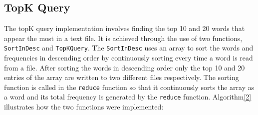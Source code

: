 \documentclass[conference]{IEEEtran}
\begin{document}
\subsection{TopK Query}
The topK query implementation involves finding the top 10 and 20 words that appear the most in a text file. It is achieved through the use of two functions, \texttt{SortInDesc} and \texttt{TopKQuery}. The \texttt{SortInDesc} uses an array to sort the words and frequencies in descending order by continuously sorting every time a word is read from a file. After sorting the words in descending order only the top 10 and 20 entries of the array are written to two different files respectively. The sorting function is called in the \texttt{reduce} function so that it continuously sorts the array as a word and its total frequency is generated by the \texttt{reduce} function. Algorithm\ref{2} illustrates how the two functions were implemented:
\linesnumbered
\end{document}
